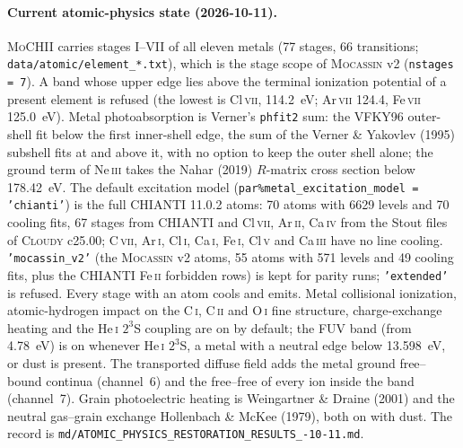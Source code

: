 \documentclass[english,a4paper]{my_memo}
\newcommand{\code}[1]{\texttt{#1}}
\newcommand{\MoCHII}{\textsc{MoCHII}}
\newcommand{\Mocassin}{\textsc{Mocassin}}
\newcommand{\Cloudy}{\textsc{Cloudy}}
\newcommand{\HeI}{He\,\textsc{i}}
\begin{document}
\tableofcontents

\paragraph{Current atomic-physics state (2026-10-11).}
\MoCHII{} carries stages I--VII of all eleven metals (77 stages,
66 transitions; \code{data/atomic/element\_*.txt}), which is the stage scope
of \Mocassin{} v2 (\code{nstages = 7}).  A band whose upper edge lies above
the terminal ionization potential of a present element is refused (the lowest
is Cl\,\textsc{vii}, 114.2~eV; Ar\,\textsc{vii} 124.4, Fe\,\textsc{vii}
125.0~eV).  Metal photoabsorption is Verner's \code{phfit2} sum: the VFKY96
outer-shell fit below the first inner-shell edge, the sum of the Verner \&
Yakovlev (1995) subshell fits at and above it, with no option to keep the
outer shell alone; the ground term of Ne\,\textsc{iii} takes the Nahar (2019)
$R$-matrix cross section below 178.42~eV.  The default excitation model
(\code{par\%metal\_excitation\_model = 'chianti'}) is the full CHIANTI
11.0.2 atoms: 70 atoms with 6629 levels and 70 cooling fits, 67 stages from
CHIANTI and Cl\,\textsc{vii}, Ar\,\textsc{ii}, Ca\,\textsc{iv} from the Stout
files of \Cloudy{} c25.00; C\,\textsc{vii}, Ar\,\textsc{i}, Cl\,\textsc{i},
Ca\,\textsc{i}, Fe\,\textsc{i}, Cl\,\textsc{v} and Ca\,\textsc{iii} have no
line cooling.  \code{'mocassin\_v2'} (the \Mocassin{} v2 atoms, 55 atoms
with 571 levels and 49 cooling fits, plus the CHIANTI Fe\,\textsc{ii}
forbidden rows) is kept for parity runs; \code{'extended'} is refused.
Every stage with an atom cools and emits.  Metal collisional ionization,
atomic-hydrogen impact on the C\,\textsc{i}, C\,\textsc{ii} and
O\,\textsc{i} fine structure, charge-exchange heating and the \HeI{} $2^3$S
coupling are on by default; the FUV band (from 4.78~eV) is on whenever
\HeI{} $2^3$S, a metal with a neutral edge below 13.598~eV, or dust is
present.  The transported diffuse field adds the metal ground free--bound
continua (channel~6) and the free--free of every ion inside the band
(channel~7).  Grain photoelectric heating is Weingartner \& Draine (2001)
and the neutral gas--grain exchange Hollenbach \& McKee (1979), both on with
dust.  The record is \code{md/\allowbreak ATOMIC\_PHYSICS\_\allowbreak RESTORATION\_\allowbreak RESULTS\_\allowbreak 2026-10-11.md}.
\end{document}
